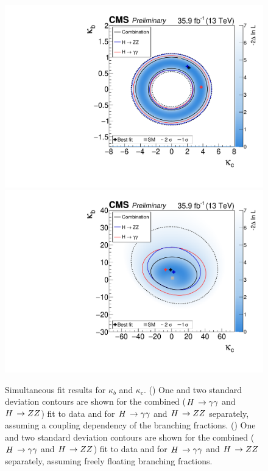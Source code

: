 \begin{figure}[hbtp]
  \begin{center}
    \includegraphics[width=0.49\linewidth]{img/resultsapproval/reworked/multicont_Yukawa_couplingdependentBRs.pdf}
    \includegraphics[width=0.49\linewidth]{img/resultsapproval/reworked/multicont_Yukawa_floatingBRs.pdf}
    \caption{
        Simultaneous fit results for $\kappa_b$ and $\kappa_c$.
        (\cmsLeft) One and two standard deviation contours are shown for the combined ($H\,\to\gamma\gamma$ and $H\,\to ZZ$) fit to data and for $H\,\to\gamma\gamma$ and $H\,\to ZZ$ separately, assuming a coupling dependency of the branching fractions.
        (\cmsRight) One and two standard deviation contours are shown for the combined ($H\,\to\gamma\gamma$ and $H\,\to ZZ$) fit to data and for $H\,\to\gamma\gamma$ and $H\,\to ZZ$ separately, assuming freely floating branching fractions.
        }
    \label{fig:scans_kappabkappac_nominal}
  \end{center}
\end{figure}


